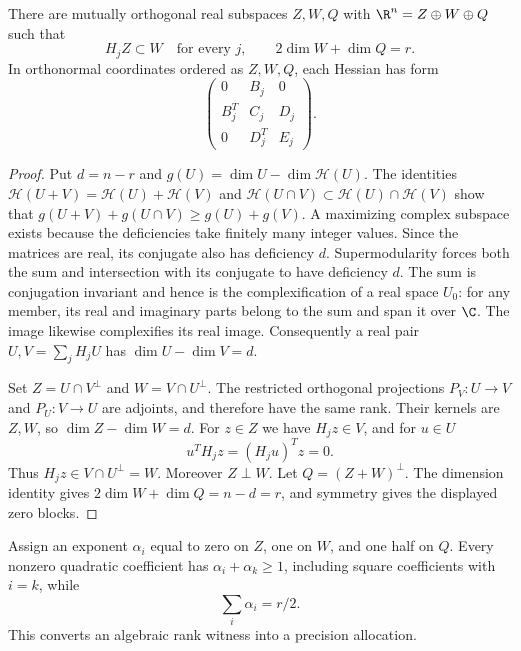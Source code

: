 \begin{lemma}\label{lem:symmetric-shrink}
There are mutually orthogonal real subspaces $Z,W,Q$ with
$\R^n=Z\oplus W\oplus Q$ such that
\begin{equation}\label{eq:shrinking-blocks}
 H_j Z\subset W\quad\text{for every }j,
 \qquad 2\dim W+\dim Q=r.
\end{equation}
In orthonormal coordinates ordered as $Z,W,Q$, each Hessian has form
\begin{equation}\label{eq:block-pattern}
 \begin{pmatrix}
 0&B_j&0\\ B_j^T&C_j&D_j\\0&D_j^T&E_j
 \end{pmatrix}.
\end{equation}
\end{lemma}
\begin{proof}
Put $d=n-r$ and $g(U)=\dim U-\dim\mathcal H(U)$. The identities
$\mathcal H(U+V)=\mathcal H(U)+\mathcal H(V)$ and
$\mathcal H(U\cap V)\subset\mathcal H(U)\cap\mathcal H(V)$ show that
$g(U+V)+g(U\cap V)\ge g(U)+g(V)$. A maximizing complex subspace exists
because the deficiencies take finitely many integer values. Since the
matrices are real, its conjugate also has deficiency $d$.
Supermodularity forces both the sum and intersection with its conjugate
to have deficiency $d$. The sum is conjugation invariant and hence is
the complexification of a real space $U_0$: for any member, its real
and imaginary parts belong to the sum and span it over $\C$.
The image likewise complexifies its real image. Consequently a real
pair $U,V=\sum_jH_jU$ has $\dim U-\dim V=d$.

Set $Z=U\cap V^\perp$ and $W=V\cap U^\perp$. The restricted orthogonal
projections $P_V:U\to V$ and $P_U:V\to U$ are adjoints, and therefore
have the same rank. Their kernels are $Z,W$, so
$\dim Z-\dim W=d$. For $z\in Z$ we have $H_jz\in V$, and for $u\in U$
\[
 u^TH_jz=(H_ju)^Tz=0.
\]
Thus $H_jz\in V\cap U^\perp=W$. Moreover $Z\perp W$.
Let $Q=(Z+W)^\perp$. The dimension identity gives
$2\dim W+\dim Q=n-d=r$, and symmetry gives the displayed zero blocks.
\end{proof}

Assign an exponent $\alpha_i$ equal to zero on $Z$, one on $W$, and
one half on $Q$. Every nonzero quadratic coefficient has
$\alpha_i+\alpha_k\ge1$, including square coefficients with $i=k$,
while
\begin{equation}\label{eq:exponent-sum}
 \sum_i\alpha_i=r/2.
\end{equation}
This converts an algebraic rank witness into a precision allocation.

